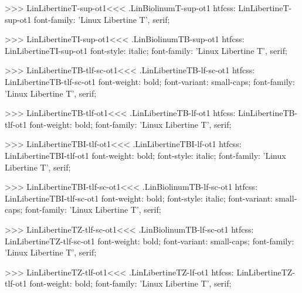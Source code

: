 {{{{{{{>>>
\<LinLibertineT-sup-ot1\><<<
.LinBiolinumT-sup-ot1
htfcss:  LinLibertineT-sup-ot1  font-family: 'Linux Libertine T', serif;

>>>
\<LinLibertineTI-sup-ot1\><<<
.LinBiolinumTB-sup-ot1
htfcss:  LinLibertineTI-sup-ot1  font-style: italic; font-family: 'Linux Libertine T', serif;

>>>
\<LinLibertineTB-tlf-sc-ot1\><<<
.LinLibertineTB-lf-sc-ot1
htfcss:  LinLibertineTB-tlf-sc-ot1  font-weight: bold; font-variant: small-caps; font-family: 'Linux Libertine T', serif;

>>>
\<LinLibertineTB-tlf-ot1\><<<
.LinLibertineTB-lf-ot1
htfcss:  LinLibertineTB-tlf-ot1  font-weight: bold; font-family: 'Linux Libertine T', serif;

>>>
\<LinLibertineTBI-tlf-ot1\><<<
.LinLibertineTBI-lf-ot1
htfcss:  LinLibertineTBI-tlf-ot1  font-weight: bold; font-style: italic; font-family: 'Linux Libertine T', serif;

>>>
\<LinLibertineTBI-tlf-sc-ot1\><<<
.LinBiolinumTB-lf-sc-ot1
htfcss:  LinLibertineTBI-tlf-sc-ot1  font-weight: bold; font-style: italic; font-variant: small-caps; font-family: 'Linux Libertine T', serif;

>>>
\<LinLibertineTZ-tlf-sc-ot1\><<<
.LinBiolinumTB-lf-sc-ot1
htfcss:  LinLibertineTZ-tlf-sc-ot1  font-weight: bold; font-variant: small-caps; font-family: 'Linux Libertine T', serif;

>>>
\<LinLibertineTZ-tlf-ot1\><<<
.LinLibertineTZ-lf-ot1
htfcss:  LinLibertineTZ-tlf-ot1  font-weight: bold; font-family: 'Linux Libertine T', serif;

}}}}}}}
